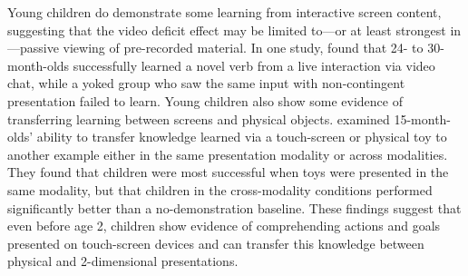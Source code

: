 \documentclass[man,noapacite]{apa2}
\begin{document}
Young children do demonstrate some learning from interactive screen content, suggesting that the video deficit effect may be limited to---or at least strongest in---passive viewing of pre-recorded material. In one study,  found that 24- to 30-month-olds successfully learned a novel verb from a live interaction via video chat, while a yoked group who saw the same input with non-contingent presentation failed to learn.
Young children also show some evidence of transferring learning between screens and physical objects.  examined 15-month-olds' ability to transfer knowledge learned via a touch-screen or physical toy to another example either in the same presentation modality or across modalities. They found that children were most successful when toys were presented in the same modality, but that children in the cross-modality conditions performed significantly better than a no-demonstration baseline. These findings suggest that even before age 2, children show evidence of comprehending actions and goals presented on touch-screen devices and can transfer this knowledge between physical and 2-dimensional presentations.
\end{document}

